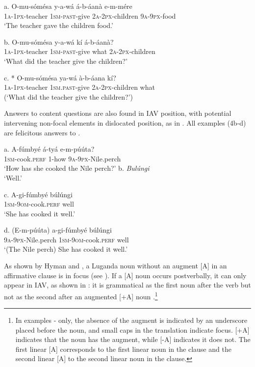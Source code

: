 \documentclass[output=paper]{langsci/langscibook}
\begin{document}
\ea
\gll a.  O-mu-sómésa  y-a-wá     á-b-áanà    e-m-mére\\
       \textsc{1a-1px}-teacher  \textsc{1sm-past}-give  \textsc{2a-2px}-children  \textsc{9a}-\textsc{9px}-food\\
\glt   ‘The teacher gave the children food.’
\z

\ea
\gll b.  O-mu-sómésa  y-a-wá    kí  á-b-áanà?\\
       \textsc{1a-1px}-teacher  \textsc{1sm-past}-give  what  \textsc{2a-2px}-children\\
\glt   ‘What did the teacher give the children?’
\z

\ea
\gll c.  * O-mu-sómésa  ya-wá      à-b-áana    kí?\\
       \textsc{1a-1px}-teacher  \textsc{1sm.past-}give  \textsc{2a-2px}-children  what\\
\glt   (‘What did the teacher give the children?’)
\z

Answers to content questions are also found in IAV position, with potential intervening non-focal elements in dislocated position, as in . All examples (4b-d) are felicitous answers to .

\ea
\gll a.  A-fúmbyé    á-tyá    e-m-púúta?\\
     \textsc{  1sm}-cook.\textsc{perf}  1-how    \textsc{9a}-\textsc{9px}-Nile.perch\\
\glt ‘How has she cooked the Nile perch?’
\z
\ea
 b.  \textit{Bulúngi}\\
\glt  ‘Well.’
\z

\ea
\gll c.  A-gi-fúmbyé      búlúngi\\
       \textsc{1sm}-\textsc{9om}-cook.\textsc{perf}  well\\
\glt   ‘She has cooked it well.’
\z

\ea
\gll d.  (E-m-púúta)    a-gi-fúmbyé      búlúngi\\
       \textsc{9a}-\textsc{9px}-Nile.perch  \textsc{1sm}-\textsc{9om}-cook.\textsc{perf}  well\\
\glt   ‘(The Nile perch) She has cooked it well.’
\z

As shown by Hyman and \citet{Katamba1993}, a Luganda noun without an augment [A] in an affirmative clause is in focus (see ). If a [A] noun occurs postverbally, it can only appear in IAV, as shown in : it is grammatical as the first noun after the verb  but not as the second after an augmented [+A] noun .\footnote{In examples - only, the absence of the augment is indicated by an underscore placed before the noun, and small caps in the translation indicate focus. [+A] indicates that the noun has the augment, while [-A] indicates it does not.  The first linear [A] corresponds to the first linear noun in the clause and the second linear [A] to the second linear noun in the clause.} 
\end{document}
